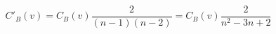 \documentclass[12pt]{article}
\begin{document}
\[
C'_B\left(v\right) = C_B\left(v\right)\frac{2}{\left(n - 1\right)\left(n - 2\right)}
=
C_B\left(v\right)\frac{2}{n^2-3n+2}
\]
\end{document}
